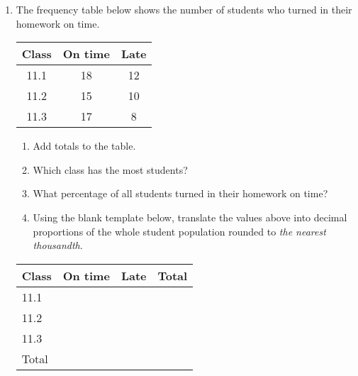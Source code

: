 \documentclass[12pt, twoside]{article}
\begin{document}
\begin{enumerate}[itemsep=0.5cm]
\newpage
\item The frequency table below shows the number of students who turned in their homework on time.
    \begin{center}
        \begin{tabular}{|c|c|c|}
            \hline
            Class & On time & Late \\
            \hline
            11.1 & 18 & 12 \\[0.25cm]
            \hline
            11.2 & 15 & 10 \\[0.25cm]
            \hline
            11.3 & 17 & 8 \\[0.25cm]
            \hline
        \end{tabular}
    \end{center} \vspace{1cm}
    \begin{enumerate}
        \item Add totals to the table.
        \item Which class has the most students? \vspace{1cm}
        \item What percentage of all students turned in their homework on time? \vspace{2cm}
        \item Using the blank template below, translate the values above into decimal proportions of the whole student population rounded to \emph{the nearest thousandth}.
    \end{enumerate}
    \begin{center}
        \begin{tabular}{|p{1cm}|p{2cm}|p{2cm}|p{2cm}|}
            \hline
            Class & \; On time & \quad Late& \quad Total\\
            \hline
            11.1 & & & \\[0.25cm]
            \hline
            11.2 &  & & \\[0.25cm]
            \hline
            11.3 & & & \\[0.25cm]
            \hline
            Total & & & \\[0.25cm]
            \hline
        \end{tabular}
    \end{center} 


\end{enumerate}
\end{document}
